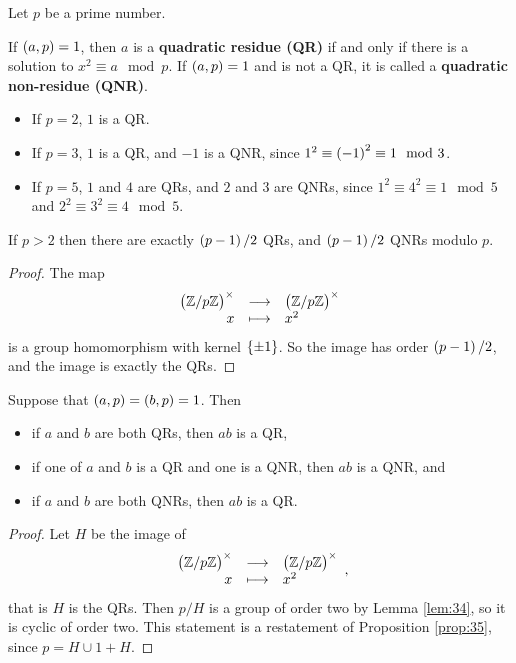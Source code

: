 Let $ p $ be a prime number.

\begin{definition}
If $ \br{a, p} = 1 $, then $ a $ is a \textbf{quadratic residue (QR)} if and only if there is a solution to $ x^2 \equiv a \mod p $. If $ \br{a, p} = 1 $ and is not a QR, it is called a \textbf{quadratic non-residue (QNR)}.
\end{definition}

\begin{example*}
\hfill
\begin{itemize}
\item If $ p = 2 $, $ 1 $ is a QR.
\item If $ p = 3 $, $ 1 $ is a QR, and $ -1 $ is a QNR, since $ 1^2 \equiv \br{-1}^2 \equiv 1 \mod 3 $.
\item If $ p = 5 $, $ 1 $ and $ 4 $ are QRs, and $ 2 $ and $ 3 $ are QNRs, since $ 1^2 \equiv 4^2 \equiv 1 \mod 5 $ and $ 2^2 \equiv 3^2 \equiv 4 \mod 5 $.
\end{itemize}
\end{example*}

\begin{lemma}
\label{lem:34}
If $ p > 2 $ then there are exactly $ \br{p - 1} / 2 $ QRs, and $ \br{p - 1} / 2 $ QNRs modulo $ p $.
\end{lemma}

\begin{proof}
The map
$$ \function{\unit{p}}{\unit{p}}{x}{x^2} $$
is a group homomorphism with kernel $ \cbr{\pm 1} $. So the image has order $ \br{p - 1} / 2 $, and the image is exactly the QRs.
\end{proof}

\begin{proposition}
\label{prop:35}
Suppose that $ \br{a, p} = \br{b, p} = 1 $. Then
\begin{itemize}
\item if $ a $ and $ b $ are both QRs, then $ ab $ is a QR,
\item if one of $ a $ and $ b $ is a QR and one is a QNR, then $ ab $ is a QNR, and
\item if $ a $ and $ b $ are both QNRs, then $ ab $ is a QR.
\end{itemize}
\end{proposition}

\begin{proof}
Let $ H $ be the image of
$$ \function{\unit{p}}{\unit{p}}{x}{x^2}, $$
that is $ H $ is the QRs. Then $ \unit{p} / H $ is a group of order two by Lemma \ref{lem:34}, so it is cyclic of order two. This statement is a restatement of Proposition \ref{prop:35}, since $ \unit{p} = H \cup 1 + H $.
\end{proof}

